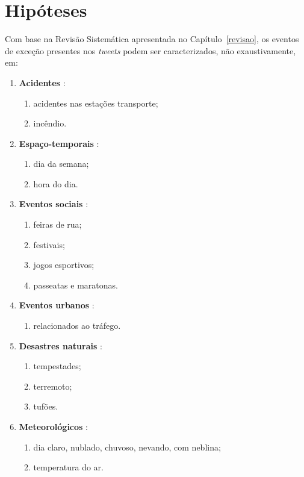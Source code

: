 \documentclass[
	12pt,				%
	oneside,			%
	a4paper,			%
	english,			%
	brazil				%
	]{abntex2ppgsi}
\begin{document}
{\section{Hipóteses}
\label{hipoteses}

Com base na Revisão Sistemática apresentada no Capítulo~\ref{revisao}, os eventos de exceção presentes nos \textit{tweets} podem ser caracterizados, não exaustivamente, em:

\begin{enumerate}
\item \textbf{Acidentes} \cite{Itoh2016}:
\begin{enumerate}
\item acidentes nas estações transporte;
\item incêndio.
\end{enumerate}

\item \textbf{Espaço-temporais}  \cite{Chen2016}:
\begin{enumerate}
\item dia da semana;
\item hora do dia.
\end{enumerate}

\item \textbf{Eventos sociais} \cite{Chen2016, Lecue2014, Gal-Tzur2014, Itoh2016}:
\begin{enumerate}
\item feiras de rua;
\item festivais;
\item jogos esportivos;
\item passeatas e maratonas.
\end{enumerate}

\item \textbf{Eventos urbanos} \cite{Chen2016, Lecue2014}:
\begin{enumerate}
\item relacionados ao tráfego.
\end{enumerate}

\item \textbf{Desastres naturais} \cite{Itoh2016}:
\begin{enumerate}
\item tempestades;
\item terremoto;
\item tufões.
\end{enumerate}

\item \textbf{Meteorológicos} \cite{Chen2016}:
\begin{enumerate}
\item dia claro, nublado, chuvoso, nevando, com neblina;
\item temperatura do ar.
\end{enumerate}


\end{enumerate}}
\end{document}
